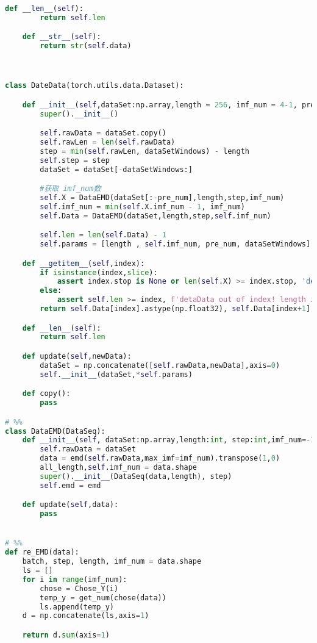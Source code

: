 \begin{appendices}
\begin{lstlisting}[language=python]
    def __len__(self):
        return self.len

    def __str__(self):
        return str(self.data)



class DateData(torch.utils.data.Dataset):

    def __init__(self,dataSet:np.array,length = 256, imf_num = 4-1, pre_num=1, dataSetWindows=1000):
        super().__init__()

        self.rawData = dataSet.copy()
        self.rawLen = len(self.rawData)
        step = min(self.rawLen, dataSetWindows) - length
        self.step = step
        dataSet = dataSet[-dataSetWindows:]

        #获取 imf_num数
        self.X = DataEMD(dataSet[:-pre_num],length,step,imf_num)
        self.imf_num = min(self.X.imf_num - 1, imf_num)
        self.Data = DataEMD(dataSet,length,step,self.imf_num)

        self.len = len(self.Data) - 1
        self.params = [length , self.imf_num, pre_num, dataSetWindows]

    def __getitem__(self,index):
        if isinstance(index,slice):
            assert index.stop is None or len(self.X) >= index.stop, 'detaData out of index!'
        else:
            assert self.len >= index, f'detaData out of index! length is {self.len} but index is {index}'
        return self.Data[index].astype(np.float32), self.Data[index+1].astype(np.float32)

    def __len__(self):
        return self.len

    def update(self,newData):
        dataSet = np.concatenate([self.rawData,newData],axis=0)
        self.__init__(dataSet,*self.params)

    def copy():
        pass

# %%
class DataEMD(DataSeq):
    def __init__(self, dataSet:np.array,length:int, step:int,imf_num=-1,emd = EMD()):
        self.rawData = dataSet
        data = emd(self.rawData,max_imf=imf_num).transpose(1,0)
        all_length,self.imf_num = data.shape
        super().__init__(DataSeq(data,length), step)
        self.emd = emd

    def update(self,data):
        pass


# %%
def re_EMD(data):
    batch, step, length, imf_num = data.shape
    ls = []
    for i in range(imf_num):
        chose = Chose_Y(i)
        temp_y = get_num(chose(data))
        ls.append(temp_y)
    d = np.concatenate(ls,axis=1)

    return d.sum(axis=1)



\end{lstlisting}
\end{appendices}
